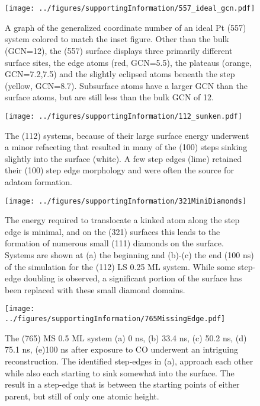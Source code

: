
\chapter{}
\label{app:SI2}

\begin{figure}
\texttt{[image: ../figures/supportingInformation/557\_ideal\_gcn.pdf]}
\caption{A graph of the generalized coordinate number of an ideal Pt (557)
system colored to match the inset figure. Other than the bulk (GCN=12), the
(557) surface displays three primarily different surface sites, the edge atoms
(red, GCN=5.5), the plateaus (orange, GCN=7.2,7.5) and the slightly eclipsed
atoms beneath the step (yellow, GCN=8.7). Subsurface atoms have a larger GCN
than the surface atoms, but are still less than the bulk GCN of 12.}
\label{fig:557GCN}
\end{figure}


\newpage



\begin{figure}
\texttt{[image: ../figures/supportingInformation/112\_sunken.pdf]}
\caption{The (112) systems, because of their large surface energy underwent a
minor refaceting that resulted in many of the (100) steps sinking slightly into
the surface (white). A few step edges (lime) retained their (100) step edge
morphology and were often the source for adatom formation.}
\label{fig:112sunken}
\end{figure}
\newpage


\begin{figure}
\texttt{[image: ../figures/supportingInformation/321MiniDiamonds]}
\caption{The energy required to translocate a kinked atom along the step edge
is minimal, and on the (321) surfaces this leads to the formation of numerous
small (111) diamonds on the surface. Systems are shown at (a) the beginning and
(b)-(c) the end (100 ns) of the simulation for the (112) LS 0.25 ML system.
While some step-edge doubling is observed, a significant portion of the surface
has been replaced with these small diamond domains.}
\label{fig:321Diamonds}
\end{figure}
\newpage







\begin{figure}
\texttt{[image: ../figures/supportingInformation/765MissingEdge.pdf]}
\caption{The (765) MS 0.5 ML system (a) 0 ns, (b) 33.4 ns, (c) 50.2 ns, (d)
75.1 ns, (e)100 ns after exposure to CO underwent an intriguing reconstruction.
The identified step-edges in (a), approach each other while also each starting
to sink somewhat into the surface. The result in a step-edge that is between
the starting points of either parent, but still of only one atomic height.}
\label{fig:765Edge}
\end{figure}
\newpage

